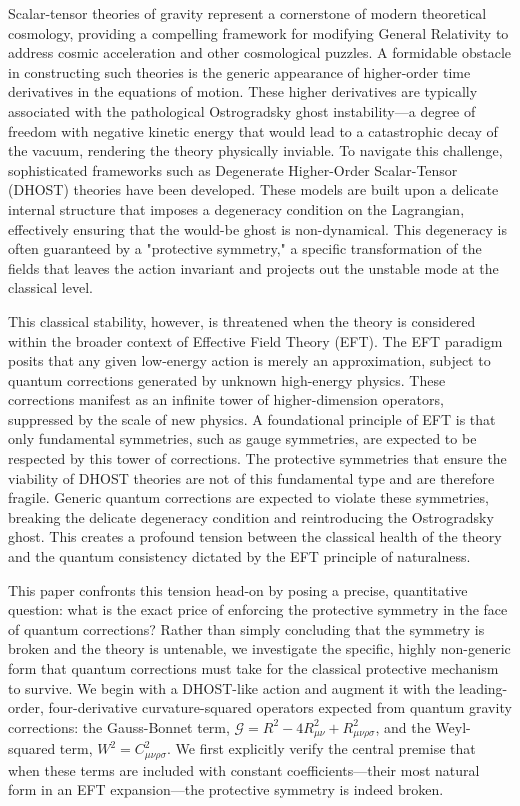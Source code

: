 \documentclass[twocolumn]{aastex631}
\begin{document}
Scalar-tensor theories of gravity represent a cornerstone of modern theoretical cosmology, providing a compelling framework for modifying General Relativity to address cosmic acceleration and other cosmological puzzles. A formidable obstacle in constructing such theories is the generic appearance of higher-order time derivatives in the equations of motion. These higher derivatives are typically associated with the pathological Ostrogradsky ghost instability---a degree of freedom with negative kinetic energy that would lead to a catastrophic decay of the vacuum, rendering the theory physically inviable. To navigate this challenge, sophisticated frameworks such as Degenerate Higher-Order Scalar-Tensor (DHOST) theories have been developed. These models are built upon a delicate internal structure that imposes a degeneracy condition on the Lagrangian, effectively ensuring that the would-be ghost is non-dynamical. This degeneracy is often guaranteed by a "protective symmetry," a specific transformation of the fields that leaves the action invariant and projects out the unstable mode at the classical level.

This classical stability, however, is threatened when the theory is considered within the broader context of Effective Field Theory (EFT). The EFT paradigm posits that any given low-energy action is merely an approximation, subject to quantum corrections generated by unknown high-energy physics. These corrections manifest as an infinite tower of higher-dimension operators, suppressed by the scale of new physics. A foundational principle of EFT is that only fundamental symmetries, such as gauge symmetries, are expected to be respected by this tower of corrections. The protective symmetries that ensure the viability of DHOST theories are not of this fundamental type and are therefore fragile. Generic quantum corrections are expected to violate these symmetries, breaking the delicate degeneracy condition and reintroducing the Ostrogradsky ghost. This creates a profound tension between the classical health of the theory and the quantum consistency dictated by the EFT principle of naturalness.

This paper confronts this tension head-on by posing a precise, quantitative question: what is the exact price of enforcing the protective symmetry in the face of quantum corrections? Rather than simply concluding that the symmetry is broken and the theory is untenable, we investigate the specific, highly non-generic form that quantum corrections must take for the classical protective mechanism to survive. We begin with a DHOST-like action and augment it with the leading-order, four-derivative curvature-squared operators expected from quantum gravity corrections: the Gauss-Bonnet term, $\mathcal{G} = R^2 - 4R_{\mu\nu}^2 + R_{\mu\nu\rho\sigma}^2$, and the Weyl-squared term, $W^2 = C_{\mu\nu\rho\sigma}^2$. We first explicitly verify the central premise that when these terms are included with constant coefficients---their most natural form in an EFT expansion---the protective symmetry is indeed broken.
\end{document}
